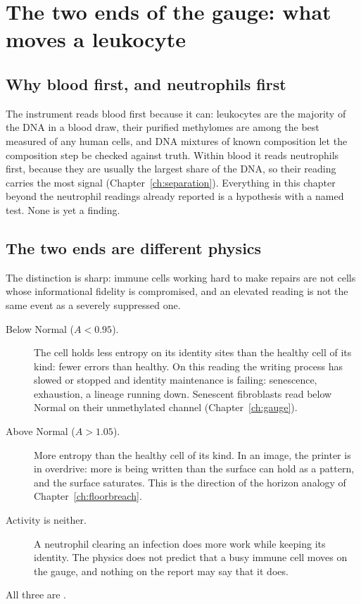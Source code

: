 \chapter{The two ends of the gauge: what moves a leukocyte}\label{ch:leukocyte}

\section{Why blood first, and neutrophils first}

The instrument reads blood first because it can: leukocytes are the majority of the DNA in a blood draw, their purified methylomes are among the best
measured of any human cells, and DNA mixtures of known composition let the composition step be checked against truth. Within blood it reads neutrophils
first, because they are usually the largest share of the DNA, so their reading carries the most signal (Chapter~\ref{ch:separation}). Everything in this
chapter beyond the neutrophil readings already reported is a hypothesis with a named test. None is yet a finding.

\section{The two ends are different physics}

The distinction is sharp: immune cells working hard to make repairs are not cells whose informational fidelity is compromised,
and an elevated reading is not the same event as a severely suppressed one.

\begin{description}
\item[Below Normal ($A<0.95$).] The cell holds less entropy on its identity sites than the healthy cell of its kind: fewer errors than healthy. On this
      reading the writing process has slowed or stopped and identity maintenance is failing: senescence, exhaustion, a lineage running down. Senescent
      fibroblasts read below Normal on their unmethylated channel (Chapter~\ref{ch:gauge}).
\item[Above Normal ($A>1.05$).] More entropy than the healthy cell of its kind. In an image, the printer is in overdrive: more is being written than
      the surface can hold as a pattern, and the surface saturates. This is the direction of the horizon analogy of Chapter~\ref{ch:floorbreach}.
\item[Activity is neither.] A neutrophil clearing an infection does more work while keeping its identity. The physics does not predict that a busy immune cell
      moves on the gauge, and nothing on the report may say that it does.
\end{description}
All three are \conjecture.

